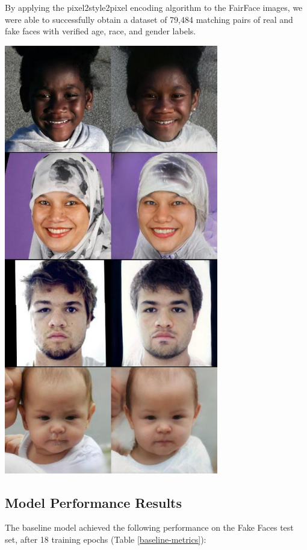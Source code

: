 \documentclass[11pt, letterpaper]{article}
\newenvironment{Figure}
  {\par\medskip\noindent\minipage{\linewidth}}
  {\endminipage\par\medskip}
\begin{document}
\begin{multicols}{2}
  By applying the pixel2style2pixel encoding algorithm to the FairFace images,
  we were able to successfully obtain a dataset of 79,484 matching pairs of
  real and fake faces with verified age, race, and gender labels.

  \begin{Figure}
    \centering
    \includegraphics[width=0.7\textwidth]{figures/fair2fake.jpg}
    \label{fair2fake}
  \end{Figure}

  \subsection{Model Performance Results}

  The baseline model achieved the following performance on the Fake Faces test
  set, after 18 training epochs (Table \ref{baseline-metrics}):


\end{multicols}
\end{document}
